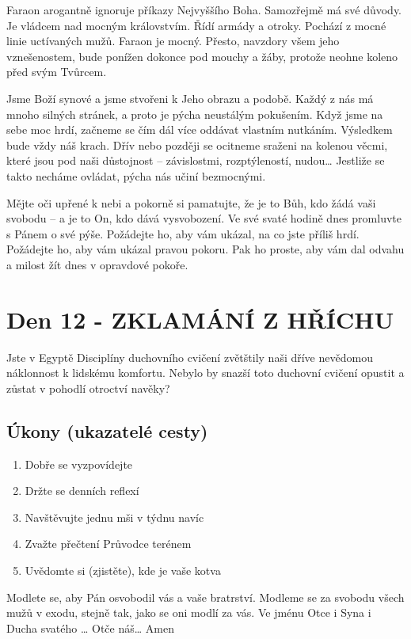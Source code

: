 \documentclass[11pt]{article}
\newcommand{\zacatekDruhyTyden}{
  Jste v Egyptě \newline
  Disciplíny duchovního cvičení zvětštily naši dříve nevědomou náklonnost k lidskému komfortu.
  Nebylo by snazší toto duchovní cvičení opustit a zůstat v pohodlí otroctví navěky?

  \subsection*{Úkony (ukazatelé cesty)}
\begin{enumerate}
  \item Dobře se vyzpovídejte
  \item Držte se denních reflexí
  \item Navštěvujte jednu mši v týdnu navíc
  \item Zvažte přečtení Průvodce terénem
  \item Uvědomte si (zjistěte), kde je vaše kotva
\end{enumerate}
Modlete se, aby Pán osvobodil vás a vaše bratrství. \newline
Modleme se za svobodu všech mužů v exodu, stejně tak, jako se oni modlí za vás.\newline
Ve jménu Otce i Syna i Ducha svatého …  Otče náš… Amen
}
\begin{document}
Faraon arogantně ignoruje příkazy Nejvyššího Boha. Samozřejmě má své důvody. Je vládcem nad mocným
královstvím. Řídí armády a otroky. Pochází z mocné linie uctívaných mužů. Faraon je mocný. Přesto,
navzdory všem jeho vznešenostem, bude ponížen dokonce pod mouchy a žáby, protože neohne koleno před
svým Tvůrcem.

Jsme Boží synové a jsme stvořeni k Jeho obrazu a podobě. Každý z nás má mnoho silných stránek, a proto
je pýcha neustálým pokušením. Když jsme na sebe moc hrdí, začneme se čím dál více oddávat vlastním
nutkáním. Výsledkem bude vždy náš krach. Dřív nebo později se ocitneme sraženi na kolenou věcmi, které
jsou pod naši důstojnost – závislostmi, rozptýleností, nudou… Jestliže se takto necháme ovládat, pýcha nás
učiní bezmocnými.

Mějte oči upřené k nebi a pokorně si pamatujte, že je to Bůh, kdo žádá vaši svobodu – a je to On, kdo dává
vysvobození. Ve své svaté hodině dnes promluvte s Pánem o své pýše. Požádejte ho, aby vám ukázal, na
co jste příliš hrdí. Požádejte ho, aby vám ukázal pravou pokoru. Pak ho proste, aby vám dal odvahu a milost
žít dnes v opravdové pokoře.

\newpage
\section{Den 12 - ZKLAMÁNÍ Z HŘÍCHU}
\zacatekDruhyTyden
\end{document}
